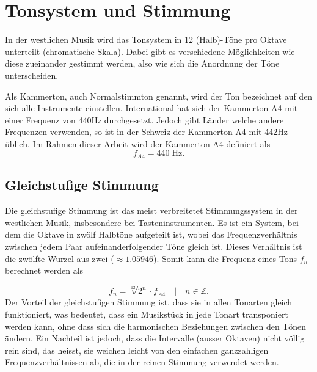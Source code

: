%
%
%
%
\section{Tonsystem und Stimmung
\label{autotune:section:tonsystemUndStimmung}}
In der westlichen Musik wird das Tonsystem in 12 (Halb)-Töne pro Oktave unterteilt (chromatische Skala).
Dabei gibt es verschiedene Möglichkeiten wie diese zueinander gestimmt werden, also wie sich die Anordnung der Töne unterscheiden.

Als Kammerton, auch Normalstimmton genannt, wird der Ton bezeichnet auf den sich alle Instrumente einstellen.
International hat sich der Kammerton A4 mit einer Frequenz von 440\;Hz durchgesetzt.
Jedoch gibt Länder welche andere Frequenzen verwenden, so ist in der Schweiz der Kammerton A4 mit 442\;Hz üblich.
Im Rahmen dieser Arbeit wird der Kammerton A4 definiert als 
\begin{equation}
    f_{A4}
    =
    440\;\text{Hz}.
\end{equation}

\subsection{Gleichstufige Stimmung
\label{autotune:subsection:gleichstuffigeStimmung}}
Die gleichstufige Stimmung ist das meist verbreitetet Stimmungssystem in der westlichen Musik, insbesondere bei Tasteninstrumenten.
Es ist ein System, bei dem die Oktave in zwölf Halbtöne aufgeteilt ist,
wobei das Frequenzverhältnis zwischen jedem Paar aufeinanderfolgender Töne gleich ist.
Dieses Verhältnis ist die zwölfte Wurzel aus zwei ($\approx 1.05946$). Somit kann die Frequenz eines Tons $f_n$ berechnet werden als

\begin{equation}
    f_n
    =
    \sqrt[12]{2^n} \cdot f_{A4}
    \quad | \quad
    n \in \mathbb{Z}.
\end{equation}
Der Vorteil der gleichstufigen Stimmung ist, dass sie in allen Tonarten gleich funktioniert, was bedeutet,
dass ein Musikstück in jede Tonart transponiert werden kann, ohne dass sich die harmonischen Beziehungen zwischen den Tönen ändern.
Ein Nachteil ist jedoch, dass die Intervalle (ausser Oktaven) nicht völlig rein sind, das heisst,
sie weichen leicht von den einfachen ganzzahligen Frequenzverhältnissen ab, die in der reinen Stimmung verwendet werden.

